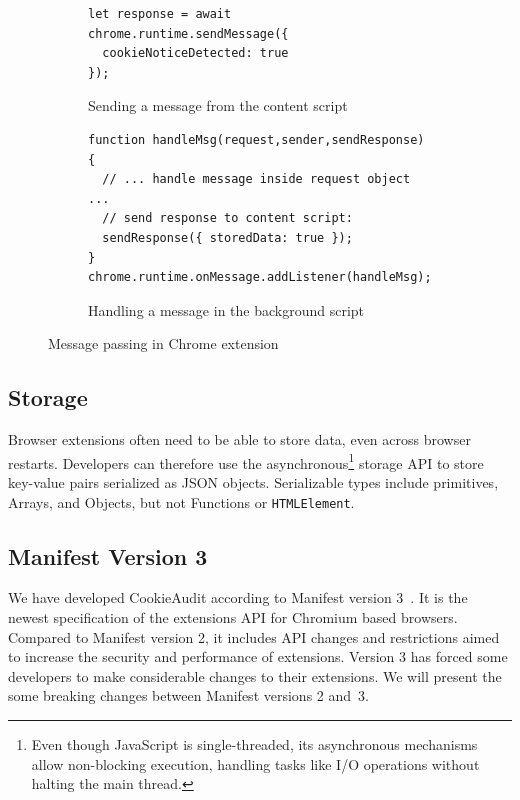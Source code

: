 \begin{figure}
	\centering
	    
	\begin{subfigure}{\textwidth}
		\centering
		\begin{lstlisting}
let response = await chrome.runtime.sendMessage({
  cookieNoticeDetected: true
});
		\end{lstlisting}
		\caption{Sending a message from the content script}
	\end{subfigure}
	    
	\begin{subfigure}{\textwidth}
		\centering
		\begin{lstlisting}
function handleMsg(request,sender,sendResponse) {
  // ... handle message inside request object ...
  // send response to content script:
  sendResponse({ storedData: true });
}
chrome.runtime.onMessage.addListener(handleMsg);
		\end{lstlisting}
		\caption{Handling a message in the background script}
	\end{subfigure}
	    
	\caption{Message passing in Chrome extension}
	\label{fig:message-passing}
\end{figure}

\subsection{Storage} \label{subsec:storage}
Browser extensions often need to be able to store data, even across browser restarts.
Developers can therefore use the asynchronous\footnote{Even though JavaScript is single-threaded, its asynchronous mechanisms allow non-blocking execution, handling tasks like I/O operations without halting the main thread.} storage API to store key-value pairs serialized as JSON objects. Serializable types include primitives, Arrays, and Objects, but not Functions or \verb|HTMLElement|.

\subsection{Manifest Version 3} \label{subsec:manifest-v3}
We have developed CookieAudit according to Manifest version 3~\cite{manifestv3}.
It is the newest specification of the extensions API for Chromium based browsers.
Compared to Manifest version 2, it includes API changes and restrictions aimed to increase the security and performance of extensions.
Version 3 has forced some developers to make considerable changes to their extensions.
We will present the some breaking changes between Manifest versions 2 and~3.

